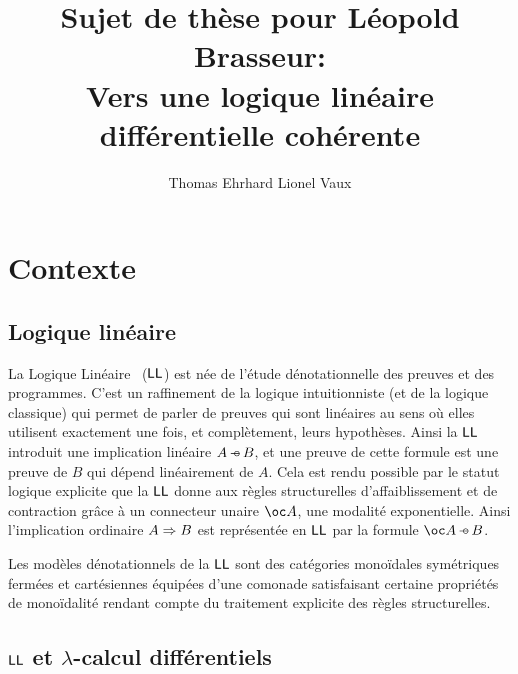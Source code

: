 \documentclass[a4]{article}
\title{Sujet de thèse pour Léopold Brasseur:\\
  Vers une logique linéaire différentielle cohérente}
\author{Thomas Ehrhard \hspace{5em} Lionel Vaux}
\begin{document}
\maketitle

\section*{Contexte}

\subsection*{Logique linéaire}

La Logique Linéaire~\cite{Girard87} ($\hbox{\textsf{LL}}$) est née de l'étude
dénotationnelle des preuves et des programmes.
%
C'est un raffinement de la logique intuitionniste (et de la logique
classique) qui permet de parler de preuves qui sont linéaires au sens
où elles utilisent exactement une fois, et complètement, leurs
hypothèses.
%
Ainsi la $\hbox{\textsf{LL}}$ introduit une implication linéaire ${A}\mathop{-\!\!\!\circ}{B}$, et une
preuve de cette formule est une preuve de $B$ qui dépend linéairement
de $A$.
%
Cela est rendu possible par le statut logique explicite que la $\hbox{\textsf{LL}}$
donne aux règles structurelles d'affaiblissement et de contraction
grâce à un connecteur unaire $\Oc A$, une modalité exponentielle.
%
Ainsi l'implication ordinaire ${A}\Rightarrow{B}$ est représentée en $\hbox{\textsf{LL}}$ par
la formule $\Limpl{\Oc A}B$.

Les modèles dénotationnels de la $\hbox{\textsf{LL}}$ sont des catégories monoïdales
sy\-mé\-tri\-ques fermées et cartésiennes équipées d'une comonade
satisfaisant certaine propriétés de monoïdalité rendant compte du
traitement explicite des règles structurelles.

\subsection*{$\hbox{\textsf{LL}}$ et $\lambda$-calcul différentiels}
\end{document}
